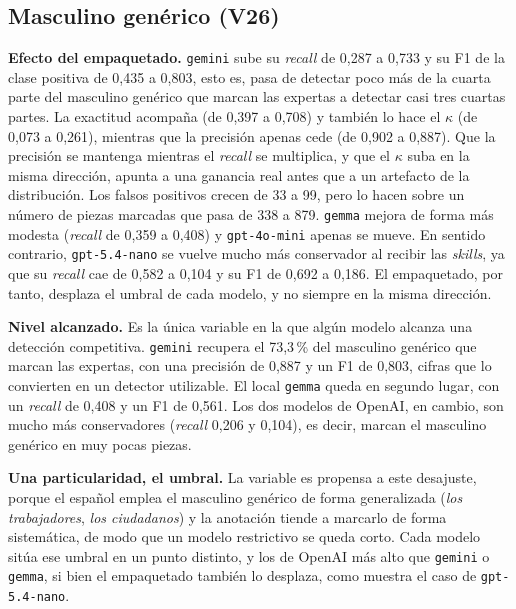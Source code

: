 \subsection{Masculino genérico (V26)}



\textbf{Efecto del empaquetado.} \texttt{gemini} sube su \textit{recall} de
0,287 a 0,733 y su F1 de la clase positiva de 0,435 a 0,803, esto es, pasa de detectar
poco más de la cuarta parte del masculino genérico que marcan las expertas a detectar
casi tres cuartas partes. La exactitud acompaña (de 0,397 a 0,708) y también lo hace el
$\kappa$ (de 0,073 a 0,261), mientras que la precisión apenas cede (de 0,902 a 0,887).
Que la precisión se mantenga mientras el \textit{recall} se multiplica, y que el $\kappa$ suba
en la misma dirección, apunta a una ganancia real antes que a un artefacto de la
distribución. Los falsos positivos crecen de 33 a 99, pero lo hacen sobre un número de
piezas marcadas que pasa de 338 a 879. \texttt{gemma} mejora de forma más
modesta (\textit{recall} de 0,359 a 0,408) y \texttt{gpt-4o-mini} apenas se mueve. En sentido
contrario, \texttt{gpt-5.4-nano} se vuelve mucho más conservador al recibir las
\textit{skills}, ya que su \textit{recall} cae de 0,582 a 0,104 y su F1 de 0,692 a 0,186. El
empaquetado, por tanto, desplaza el umbral de cada modelo, y no siempre en la misma
dirección.

\textbf{Nivel alcanzado.} Es la única variable en la que algún modelo alcanza una
detección competitiva.
\texttt{gemini} recupera el 73,3\,\% del masculino genérico que marcan las expertas,
con una precisión de 0,887 y un F1 de 0,803, cifras que lo convierten en un detector
utilizable. El local \texttt{gemma} queda en segundo lugar, con un \textit{recall} de 0,408
y un F1 de 0,561. Los dos modelos de OpenAI, en cambio, son mucho más conservadores
(\textit{recall} 0,206 y 0,104), es decir, marcan el masculino genérico en muy pocas piezas.

\textbf{Una particularidad, el umbral.} La variable es propensa a este desajuste,
porque el español emplea el masculino genérico de forma generalizada
(\textit{los trabajadores}, \textit{los ciudadanos}) y la anotación tiende a marcarlo
de forma sistemática, de modo que un modelo restrictivo se queda corto. Cada modelo
sitúa ese umbral en un punto distinto, y los de OpenAI más alto que \texttt{gemini} o
\texttt{gemma}, si bien el empaquetado también lo desplaza, como muestra el caso de
\texttt{gpt-5.4-nano}.

